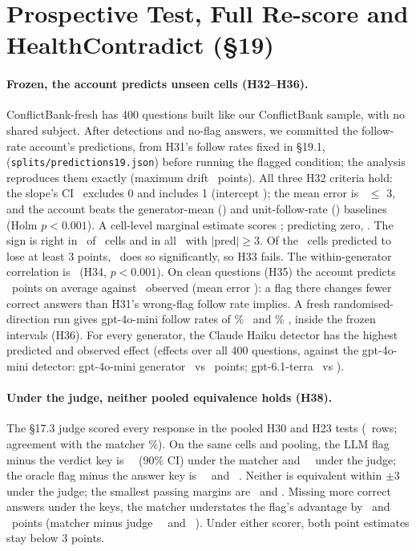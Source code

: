 \section{Prospective Test, Full Re-score and HealthContradict (\S19)}
\label{app:fresh}


\paragraph{Frozen, the account predicts unseen cells (H32--H36).} ConflictBank-fresh has 400 questions
built like our ConflictBank sample, with no shared subject. After detections and no-flag answers, we
committed the follow-rate account's predictions, from H31's follow rates fixed in \S19.1,
(\texttt{splits/predictions19.json}) before running the flagged condition; the analysis reproduces them exactly (maximum
drift \frDrift\ points). All three H32 criteria hold: the slope's CI \frSlopeCI\ excludes 0 and includes 1 (intercept
\frIntercept); the mean error is \frMae\ $\le$ 3, and the account beats the generator-mean (\frMaeGen) and
unit-follow-rate (\frMaeOnes) baselines (Holm $p<0.001$). A cell-level marginal estimate scores \frMaeMarg;
predicting zero, \frMaeZero. The sign is right in \frSignAgree\ of \frN\ cells and in all \frBigN\ with
$|\text{pred}|\ge3$. Of the \frHarmN\ cells predicted to lose at least 3 points, \frHarmConf\ does so significantly, so
H33 fails. The within-generator correlation is \frRWithin\ (H34, $p<0.001$). On clean questions (H35) the account
predicts \frCleanPred\ points on average against \frCleanObs\ observed (mean error \frCleanMae): a flag there
changes fewer correct answers than H31's wrong-flag follow rate implies. A fresh randomised-direction run gives
gpt-4o-mini follow rates of \frFollowR\% \frFollowRCI\ and \frFollowW\% \frFollowWCI, inside the frozen
intervals (H36). For every generator, the Claude Haiku detector has the highest predicted and observed effect
(effects over all 400 questions, against the gpt-4o-mini detector: gpt-4o-mini generator \frSelMiniObs\ vs \frMiniDetMiniObs\ points; gpt-6.1-terra
\frSelTerraObs\ vs \frMiniDetTerraObs).

\paragraph{Under the judge, neither pooled equivalence holds (H38).} The \S17.3 judge scored every response in the
pooled H30 and H23 tests (\jdN\ rows; agreement with the matcher \jdAgree\%). On the same cells and pooling,
the LLM flag minus the verdict key is \jdThirtyM\ \jdThirtyMNinetyCI\ (90\% CI) under the matcher and
\jdThirtyJ\ \jdThirtyJNinetyCI\ under the judge; the oracle flag minus the answer key is \jdTwentyThreeM\
\jdTwentyThreeMNinetyCI\ and \jdTwentyThreeJ\ \jdTwentyThreeJNinetyCI. Neither is equivalent within $\pm$3 under the
judge; the smallest passing margins are \jdThirtyJMargin\ and \jdTwentyThreeJMargin. Missing more
correct answers under the keys, the matcher understates the flag's advantage by \ajdThirtyShift\ and
\ajdTwentyThreeShift\ points (matcher minus judge \jdThirtyShift\ \jdThirtyShiftCI\ and \jdTwentyThreeShift\ \jdTwentyThreeShiftCI). Under either scorer, both point estimates stay below 3 points.

